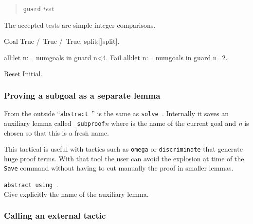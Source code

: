 \begin{quote}
{\tt guard} {\it test}
\end{quote}

The accepted tests are simple integer comparisons.

\begin{coq_example*}
Goal True /\ True /\ True.
split;[|split].
\end{coq_example*}
\begin{coq_example}
all:let n:= numgoals in guard n<4.
Fail all:let n:= numgoals in guard n=2.
\end{coq_example}
\begin{ErrMsgs}

\item {}

\end{ErrMsgs}

\begin{coq_eval}
Reset Initial.
\end{coq_eval}

\subsubsection[Proving a subgoal as a separate lemma]{Proving a subgoal as a separate lemma
}

From the outside ``\texttt{abstract \tacexpr}'' is the same as
{\tt solve \tacexpr}. Internally it saves an auxiliary lemma called 
{\ident}\texttt{\_subproof}\textit{n} where {\ident} is the name of the
current goal and \textit{n} is chosen so that this is a fresh name.

This tactical is useful with tactics such as \texttt{omega} or
\texttt{discriminate} that generate huge proof terms. With that tool
the user can avoid the explosion at time of the \texttt{Save} command
without having to cut manually the proof in smaller lemmas.

\begin{Variants}
\item \texttt{abstract {\tacexpr} using {\ident}}.\\
  Give explicitly the name of the auxiliary lemma.
\end{Variants}

\ErrMsg {}

\subsubsection[Calling an external tactic]{Calling an external tactic
}

